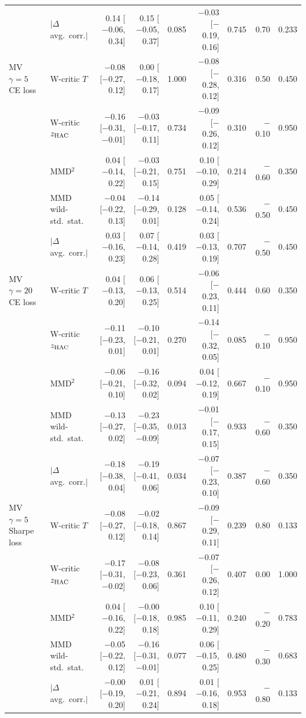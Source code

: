 \begin{tabular}{llrrrrrrr}
 & $|\Delta$ avg.\ corr.$|$ & 0.14 [$-$0.06, 0.34] & 0.15 [$-$0.05, 0.37] & 0.085 & $-$0.03 [$-$0.19, 0.16] & 0.745 & 0.70 & 0.233 \\
MV $\gamma=5$ CE loss & W-critic $T$ & $-$0.08 [$-$0.27, 0.12] & 0.00 [$-$0.18, 0.17] & 1.000 & $-$0.08 [$-$0.28, 0.12] & 0.316 & 0.50 & 0.450 \\
 & W-critic $z_{\rm HAC}$ & $-$0.16 [$-$0.31, $-$0.01] & $-$0.03 [$-$0.17, 0.11] & 0.734 & $-$0.09 [$-$0.26, 0.12] & 0.310 & $-$0.10 & 0.950 \\
 & MMD$^2$ & 0.04 [$-$0.14, 0.22] & $-$0.03 [$-$0.21, 0.15] & 0.751 & 0.10 [$-$0.10, 0.29] & 0.214 & $-$0.60 & 0.350 \\
 & MMD wild-std.\ stat. & $-$0.04 [$-$0.22, 0.13] & $-$0.14 [$-$0.29, 0.01] & 0.128 & 0.05 [$-$0.14, 0.24] & 0.536 & $-$0.50 & 0.450 \\
 & $|\Delta$ avg.\ corr.$|$ & 0.03 [$-$0.16, 0.23] & 0.07 [$-$0.14, 0.28] & 0.419 & 0.03 [$-$0.13, 0.19] & 0.707 & $-$0.50 & 0.450 \\
MV $\gamma=20$ CE loss & W-critic $T$ & 0.04 [$-$0.13, 0.20] & 0.06 [$-$0.13, 0.25] & 0.514 & $-$0.06 [$-$0.23, 0.11] & 0.444 & 0.60 & 0.350 \\
 & W-critic $z_{\rm HAC}$ & $-$0.11 [$-$0.23, 0.01] & $-$0.10 [$-$0.21, 0.01] & 0.270 & $-$0.14 [$-$0.32, 0.05] & 0.085 & $-$0.10 & 0.950 \\
 & MMD$^2$ & $-$0.06 [$-$0.21, 0.10] & $-$0.16 [$-$0.32, 0.02] & 0.094 & 0.04 [$-$0.12, 0.19] & 0.667 & $-$0.10 & 0.950 \\
 & MMD wild-std.\ stat. & $-$0.13 [$-$0.27, 0.02] & $-$0.23 [$-$0.35, $-$0.09] & 0.013 & $-$0.01 [$-$0.17, 0.15] & 0.933 & $-$0.60 & 0.350 \\
 & $|\Delta$ avg.\ corr.$|$ & $-$0.18 [$-$0.38, 0.04] & $-$0.19 [$-$0.41, 0.06] & 0.034 & $-$0.07 [$-$0.23, 0.10] & 0.387 & $-$0.60 & 0.350 \\
MV $\gamma=5$ Sharpe loss & W-critic $T$ & $-$0.08 [$-$0.27, 0.12] & $-$0.02 [$-$0.18, 0.14] & 0.867 & $-$0.09 [$-$0.29, 0.11] & 0.239 & 0.80 & 0.133 \\
 & W-critic $z_{\rm HAC}$ & $-$0.17 [$-$0.31, $-$0.02] & $-$0.08 [$-$0.23, 0.06] & 0.361 & $-$0.07 [$-$0.26, 0.12] & 0.407 & 0.00 & 1.000 \\
 & MMD$^2$ & 0.04 [$-$0.16, 0.22] & $-$0.00 [$-$0.18, 0.18] & 0.985 & 0.10 [$-$0.11, 0.29] & 0.240 & $-$0.20 & 0.783 \\
 & MMD wild-std.\ stat. & $-$0.05 [$-$0.22, 0.12] & $-$0.16 [$-$0.31, $-$0.01] & 0.077 & 0.06 [$-$0.15, 0.25] & 0.480 & $-$0.30 & 0.683 \\
 & $|\Delta$ avg.\ corr.$|$ & $-$0.00 [$-$0.19, 0.20] & 0.01 [$-$0.21, 0.24] & 0.894 & 0.01 [$-$0.16, 0.18] & 0.953 & $-$0.80 & 0.133 \\
\bottomrule
\end{tabular}
